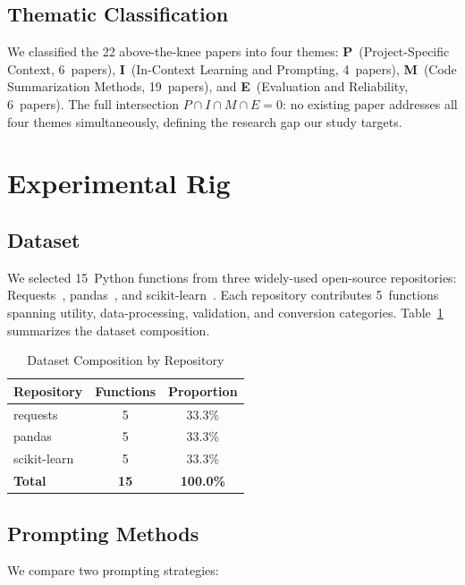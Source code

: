 \documentclass[conference]{IEEEtran}
\begin{document}
\subsection{Thematic Classification}
We classified the 22 above-the-knee papers into four themes:
\textbf{P}~(Project-Specific Context, 6~papers),
\textbf{I}~(In-Context Learning and Prompting, 4~papers),
\textbf{M}~(Code Summarization Methods, 19~papers), and
\textbf{E}~(Evaluation and Reliability, 6~papers).
The full intersection $P \cap I \cap M \cap E = 0$: no existing paper
addresses all four themes simultaneously, defining the research gap our
study targets.

\section{Experimental Rig}
\label{sec:experimental-rig}

\subsection{Dataset}
We selected 15~Python functions from three widely-used open-source
repositories: Requests~\cite{requests}, pandas~\cite{pandas}, and
scikit-learn~\cite{scikitlearn}. Each repository contributes 5~functions
spanning utility, data-processing, validation, and conversion categories.
Table~\ref{tab:dataset-composition} summarizes the dataset composition.


\begin{table}[ht]
\centering
\caption{Dataset Composition by Repository}
\label{tab:dataset-composition}
\begin{tabular}{lcc}
\toprule
Repository & Functions & Proportion \\
\midrule
requests & 5 & 33.3\% \\
pandas & 5 & 33.3\% \\
scikit-learn & 5 & 33.3\% \\
\midrule
\textbf{Total} & \textbf{15} & \textbf{100.0\%} \\
\bottomrule
\end{tabular}
\end{table}

\subsection{Prompting Methods}
We compare two prompting strategies:
\end{document}

